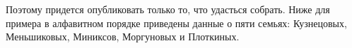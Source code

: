 Поэтому придется опубликовать только то, что удасться собрать. Ниже для примера в алфавитном порядке приведены данные о пяти семьях: Кузнецовых, Меньшиковых, Миниксов, Моргуновых и Плоткиных.




\begin{figure}[h!]

    \begin{minipage}[h!]{0.16\paperwidth}

\end{minipage}
\end{figure}
